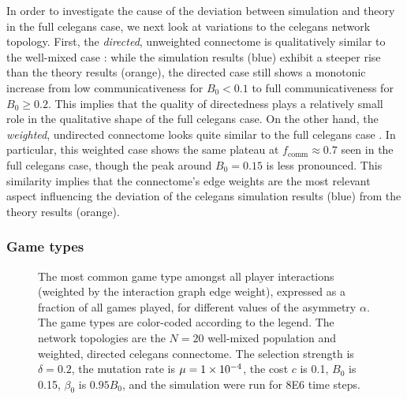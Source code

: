 \documentclass[pdflatex,lineno,referee,sn-mathphys-ay]{sn-jnl}
\begin{document}
In order to investigate the cause of the deviation
between simulation and theory
in the  full \gls{celegans} case,
we next look at variations to the \gls{celegans} network topology.
First, the 
\emph{directed}, unweighted connectome
is qualitatively similar to the
well-mixed case :
while the simulation results (blue) exhibit a steeper rise
than the theory results (orange),
the directed case still shows a monotonic increase
from low communicativeness for $B_0 < 0.1$
to full communicativeness for $B_0 \ge 0.2$.
This implies that the quality of directedness
plays a relatively small role in the qualitative shape
of the  full \gls{celegans} case.
On the other hand,
the 
\emph{weighted}, undirected connectome
looks quite similar to the 
full \gls{celegans} case .
In particular, this 
weighted case
shows the same plateau at $f_{\text{comm}} \approx 0.7$
seen in the  full \gls{celegans} case,
though the peak around $B_0 = 0.15$ is less pronounced.
This similarity implies that the connectome's edge weights
are the most relevant aspect influencing the deviation
of the  \gls{celegans}
simulation results (blue) from the theory results (orange).

\subsubsection{Game types}
\begin{figure}
  \centering
  
  \caption{
    The most common game type amongst all player interactions
    (weighted by the interaction graph edge weight),
    expressed as a fraction of all games played,
    for different values of the asymmetry $\alpha$.
    The game types are color-coded according to the legend.
    The network topologies are the
    $N=20$ well-mixed population
    and
    weighted, directed \gls{celegans} connectome.
    The selection strength is $\delta=0.2$,
    the mutation rate is $\mu=\num{1E-4}$,
    the cost $c$ is \num{0.1},
    $B_0$ is \num{0.15},
    $\beta_0$ is $\num{0.95} B_0$,
    and the simulation were run for \num{8E6} time steps.
  }
  \label{fig:game-type}
\end{figure}
\end{document}
